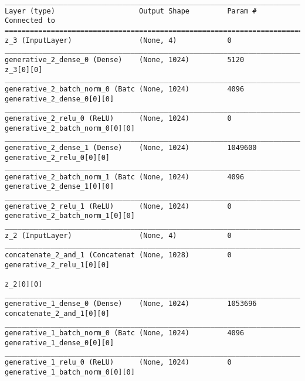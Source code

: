 \begin{lstlisting}[caption={dSprites-VLAE-GAN Decoder},captionpos=b,basicstyle=\tiny, label={lst:mnist-vlae-gan-decoder}]
__________________________________________________________________________________________________
Layer (type)                    Output Shape         Param #     Connected to
==================================================================================================
z_3 (InputLayer)                (None, 4)            0
__________________________________________________________________________________________________
generative_2_dense_0 (Dense)    (None, 1024)         5120        z_3[0][0]
__________________________________________________________________________________________________
generative_2_batch_norm_0 (Batc (None, 1024)         4096        generative_2_dense_0[0][0]
__________________________________________________________________________________________________
generative_2_relu_0 (ReLU)      (None, 1024)         0           generative_2_batch_norm_0[0][0]
__________________________________________________________________________________________________
generative_2_dense_1 (Dense)    (None, 1024)         1049600     generative_2_relu_0[0][0]
__________________________________________________________________________________________________
generative_2_batch_norm_1 (Batc (None, 1024)         4096        generative_2_dense_1[0][0]
__________________________________________________________________________________________________
generative_2_relu_1 (ReLU)      (None, 1024)         0           generative_2_batch_norm_1[0][0]
__________________________________________________________________________________________________
z_2 (InputLayer)                (None, 4)            0
__________________________________________________________________________________________________
concatenate_2_and_1 (Concatenat (None, 1028)         0           generative_2_relu_1[0][0]
                                                                 z_2[0][0]
__________________________________________________________________________________________________
generative_1_dense_0 (Dense)    (None, 1024)         1053696     concatenate_2_and_1[0][0]
__________________________________________________________________________________________________
generative_1_batch_norm_0 (Batc (None, 1024)         4096        generative_1_dense_0[0][0]
__________________________________________________________________________________________________
generative_1_relu_0 (ReLU)      (None, 1024)         0           generative_1_batch_norm_0[0][0]

\end{lstlisting}
